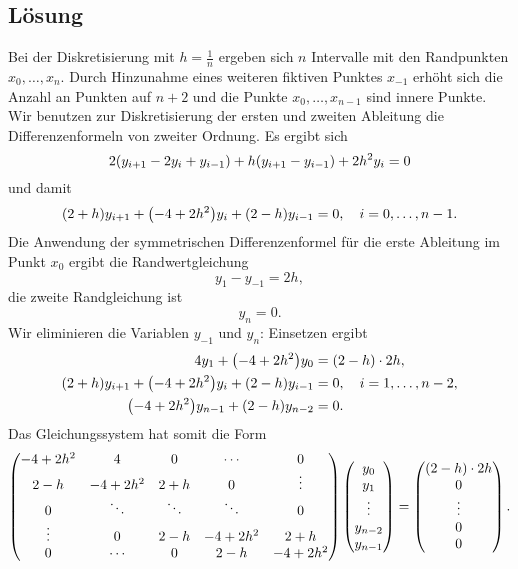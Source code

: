 \documentclass{exercise}
\begin{document}
    \subsection*{Lösung}
    Bei der Diskretisierung mit \(h = \frac{1}{n}\) ergeben sich \(n\) Intervalle mit den Randpunkten \(x_0, \ldots, x_n\).
    Durch Hinzunahme eines weiteren fiktiven Punktes \(x_{-1}\) erhöht sich die Anzahl an Punkten auf \(n + 2\) und die Punkte \(x_0, \ldots, x_{n - 1}\) sind innere Punkte.
    Wir benutzen zur Diskretisierung der ersten und zweiten Ableitung die Differenzenformeln von zweiter Ordnung.
    Es ergibt sich
    \[
        2\parentheses*{y_{i + 1} - 2y_i + y_{i - 1}} + h\parentheses*{y_{i + 1} - y_{i - 1}} + 2h^2 y_i = 0
    \]
    und damit
    \[
        \parentheses*{2 + h}y_{i + 1} + \parentheses*{-4 + 2h^2}y_i + \parentheses*{2 - h}y_{i - 1} = 0, \quad i = 0, \ldots, n - 1.
    \]
    Die Anwendung der symmetrischen Differenzenformel für die erste Ableitung im Punkt \(x_0\) ergibt die Randwertgleichung
    \[
        y_1 - y_{-1} = 2h,
    \]
    die zweite Randgleichung ist
    \[
        y_n = 0.
    \]
    Wir eliminieren die Variablen \(y_{-1}\) und \(y_n\): Einsetzen ergibt
    \begin{align*}
        4y_1 + \parentheses*{-4 + 2h^2}y_0 &= \parentheses*{2 - h} \cdot 2h,\\
        \parentheses*{2 + h}y_{i + 1} + \parentheses*{-4 + 2h^2}y_i + \parentheses*{2 - h}y_{i - 1} &= 0, \quad i = 1, \ldots, n - 2,\\
        \parentheses*{-4 + 2h^2}y_{n - 1} + \parentheses*{2 - h}y_{n - 2} &= 0.
    \end{align*}
    Das Gleichungssystem hat somit die Form
    \[
        \begin{pmatrix}
            -4 + 2h^2 & 4 & 0 & \cdots & 0\\
            2 - h & -4 + 2h^2 & 2 + h & 0 & \vdots\\
            0 & \ddots & \ddots & \ddots & 0\\
            \vdots & 0 & 2 - h & -4 + 2h^2 & 2 + h\\
            0 & \cdots & 0 & 2 - h & -4 + 2h^2
        \end{pmatrix}\begin{pmatrix}
            y_0\\y_1\\\vdots\\y_{n - 2}\\y_{n - 1}
        \end{pmatrix} = \begin{pmatrix}
            \parentheses*{2 - h} \cdot 2h\\0\\\vdots\\0\\0
        \end{pmatrix}.
    \]
\end{document}
